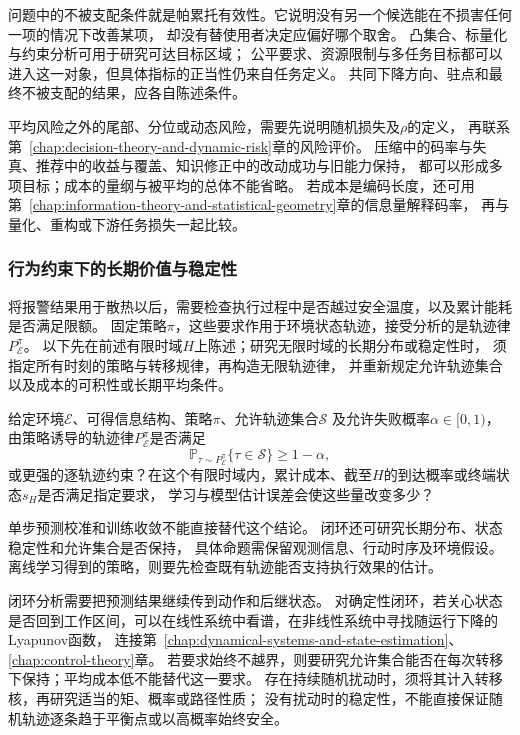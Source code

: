 问题中的不被支配条件就是帕累托有效性。它说明没有另一个候选能在不损害任何一项的情况下改善某项，
却没有替使用者决定应偏好哪个取舍。
凸集合、标量化与约束分析可用于研究可达目标区域；
公平要求、资源限制与多任务目标都可以进入这一对象，但具体指标的正当性仍来自任务定义。
共同下降方向、驻点和最终不被支配的结果，应各自陈述条件。

平均风险之外的尾部、分位或动态风险，需要先说明随机损失及$\rho$的定义，
再联系第~\ref{chap:decision-theory-and-dynamic-risk}章的风险评价。
压缩中的码率与失真、推荐中的收益与覆盖、知识修正中的改动成功与旧能力保持，
都可以形成多项目标；成本的量纲与被平均的总体不能省略。
若成本是编码长度，还可用第~\ref{chap:information-theory-and-statistical-geometry}章的信息量解释码率，
再与量化、重构或下游任务损失一起比较。

\subsubsection{行为约束下的长期价值与稳定性}
\label{sec:future-analysis-closed-loop}

将报警结果用于散热以后，需要检查执行过程中是否越过安全温度，以及累计能耗是否满足限额。
固定策略$\pi$，这些要求作用于环境状态轨迹，接受分析的是轨迹律$P_{\mathcal E}^{\pi}$。
以下先在前述有限时域$H$上陈述；研究无限时域的长期分布或稳定性时，
须指定所有时刻的策略与转移规律，再构造无限轨迹律，
并重新规定允许轨迹集合以及成本的可积性或长期平均条件。

\begin{mathproblem}[闭环轨迹能否满足长期要求]
  \label{question:future-closed-loop}
  给定环境$\mathcal E$、可得信息结构、策略$\pi$、允许轨迹集合$\mathcal S$
  及允许失败概率$\alpha\in[0,1)$，
  由策略诱导的轨迹律$P_{\mathcal E}^{\pi}$是否满足
  \[
    \mathbb P_{\tau\sim P_{\mathcal E}^{\pi}}\{\tau\in\mathcal S\}
    \geq1-\alpha,
  \]
  或更强的逐轨迹约束？在这个有限时域内，累计成本、截至$H$的到达概率或终端状态$s_H$是否满足指定要求，
  学习与模型估计误差会使这些量改变多少？
\end{mathproblem}

单步预测校准和训练收敛不能直接替代这个结论。
闭环还可研究长期分布、状态稳定性和允许集合是否保持，
具体命题需保留观测信息、行动时序及环境假设。
离线学习得到的策略，则要先检查既有轨迹能否支持执行效果的估计。

闭环分析需要把预测结果继续传到动作和后继状态。
对确定性闭环，若关心状态是否回到工作区间，可以在线性系统中看谱，在非线性系统中寻找随运行下降的Lyapunov函数，
连接第~\ref{chap:dynamical-systems-and-state-estimation}、\ref{chap:control-theory}章。
若要求始终不越界，则要研究允许集合能否在每次转移下保持；平均成本低不能替代这一要求。
存在持续随机扰动时，须将其计入转移核，再研究适当的矩、概率或路径性质；
没有扰动时的稳定性，不能直接保证随机轨迹逐条趋于平衡点或以高概率始终安全。

